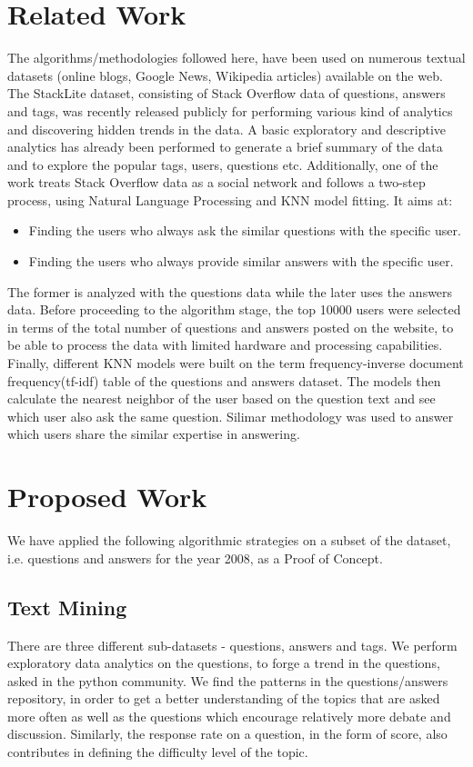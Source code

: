\documentclass[journal]{IEEEtran}
\begin{document}
\section{Related Work}
The algorithms/methodologies followed here, have been used on numerous textual datasets (online blogs, Google News, Wikipedia articles) available on the web. The StackLite dataset, consisting of Stack Overflow data of questions, answers and tags, was recently released publicly for performing various kind of analytics and discovering hidden trends in the data. A basic exploratory and descriptive analytics has already been performed to generate a brief summary of the data and to explore the popular tags, users, questions etc. Additionally, one of the work treats Stack Overflow data as a social network and follows a two-step process, using Natural Language Processing and KNN model fitting. It aims at: 
\begin{itemize}
    \item Finding the users who always ask the similar questions with the specific user.
    \item Finding the users who always provide similar answers with the specific user.
\end{itemize}
The former is analyzed with the questions data while the later uses the answers data. Before proceeding to the algorithm stage, the top 10000 users were selected in terms of the total number of questions and answers posted on the website, to be able to process the data with limited hardware and processing capabilities. Finally, different KNN models were built on the term frequency-inverse document frequency(tf-idf) table of the questions and answers dataset. The models then calculate the nearest neighbor of the user based on the question text and see which user also ask the same question. Silimar methodology was used to answer which users share the similar expertise in answering.

\section{Proposed Work}
We have applied the following algorithmic strategies on a subset of the dataset, i.e. questions and answers for the year 2008, as a Proof of Concept.

\subsection{Text Mining}
There are three different sub-datasets - questions, answers and tags. We perform exploratory data analytics on the questions, to forge a trend in the questions, asked in the python community. We find the patterns in the questions/answers repository, in order to get a better understanding of the topics that are asked more often as well as the questions which encourage relatively more debate and discussion. Similarly, the response rate on a question, in the form of score, also contributes in defining the difficulty level of the topic.
\end{document}
